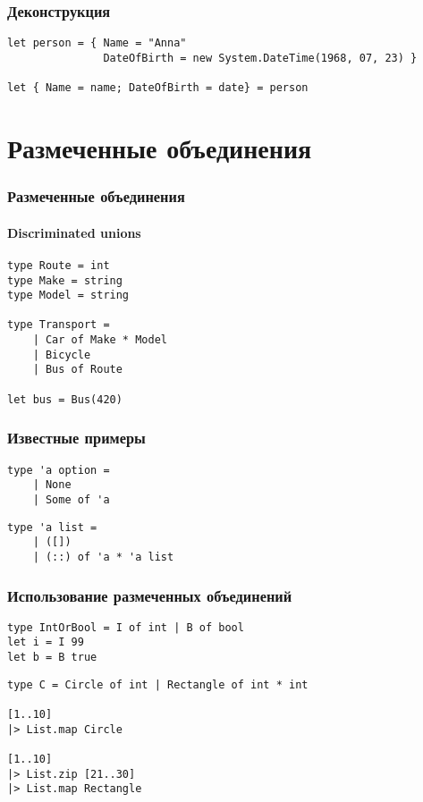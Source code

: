 \documentclass[xetex,mathserif,serif]{beamer}
\begin{document}
    \begin{frame}[fragile]
        \frametitle{Деконструкция}
        \begin{verbatim}
let person = { Name = "Anna"
               DateOfBirth = new System.DateTime(1968, 07, 23) }

let { Name = name; DateOfBirth = date} = person
        \end{verbatim}
    \end{frame}

    \section{Размеченные объединения}
    
    \begin{frame}[fragile]
        \frametitle{Размеченные объединения}
        \framesubtitle{Discriminated unions}
        \begin{verbatim}
type Route = int
type Make = string
type Model = string

type Transport =
    | Car of Make * Model
    | Bicycle
    | Bus of Route

let bus = Bus(420)
        \end{verbatim}
    \end{frame}

    \begin{frame}[fragile]
        \frametitle{Известные примеры}
        \begin{verbatim}
type 'a option =
    | None
    | Some of 'a
        \end{verbatim}

        \vspace{5mm}
        \begin{verbatim}
type 'a list =
    | ([])
    | (::) of 'a * 'a list
        \end{verbatim}
    \end{frame}

    \begin{frame}[fragile]
        \frametitle{Использование размеченных объединений}
        \begin{verbatim}
type IntOrBool = I of int | B of bool
let i = I 99
let b = B true
        \end{verbatim}
        
        \begin{verbatim}
type C = Circle of int | Rectangle of int * int

[1..10]
|> List.map Circle

[1..10]
|> List.zip [21..30]
|> List.map Rectangle
        \end{verbatim}
    \end{frame}
\end{document}
